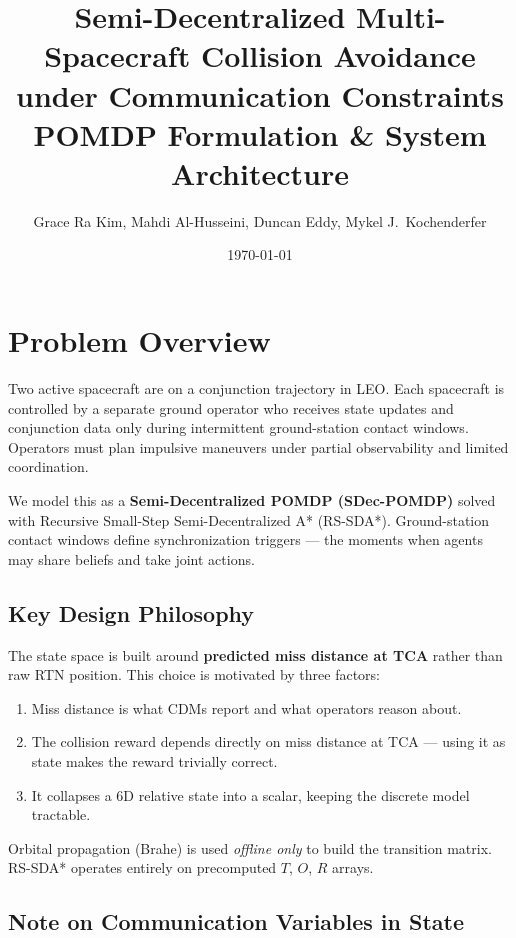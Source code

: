\documentclass[11pt]{article}
\title{\textbf{Semi-Decentralized Multi-Spacecraft Collision Avoidance\\
under Communication Constraints}\\[0.5em]
\large POMDP Formulation \& System Architecture}
\author{Grace Ra Kim, Mahdi Al-Husseini, Duncan Eddy, Mykel J.\ Kochenderfer}
\date{\today}
\begin{document}
\maketitle
\tableofcontents
\bigskip

\section{Problem Overview}

Two active spacecraft are on a conjunction trajectory in LEO. Each spacecraft is
controlled by a separate ground operator who receives state updates and conjunction
data only during intermittent ground-station contact windows. Operators must plan
impulsive maneuvers under partial observability and limited coordination.

We model this as a \textbf{Semi-Decentralized POMDP (SDec-POMDP)} solved with
Recursive Small-Step Semi-Decentralized A* (RS-SDA*). Ground-station contact
windows define synchronization triggers --- the moments when agents may share
beliefs and take joint actions.

\subsection{Key Design Philosophy}

The state space is built around \textbf{predicted miss distance at TCA} rather
than raw RTN position. This choice is motivated by three factors:
\begin{enumerate}
  \item Miss distance is what CDMs report and what operators reason about.
  \item The collision reward depends directly on miss distance at TCA --- using
        it as state makes the reward trivially correct.
  \item It collapses a 6D relative state into a scalar, keeping the discrete
        model tractable.
\end{enumerate}

Orbital propagation (Brahe) is used \emph{offline only} to build the transition
matrix. RS-SDA* operates entirely on precomputed $T$, $O$, $R$ arrays.

\subsection*{Note on Communication Variables in State}
\end{document}
